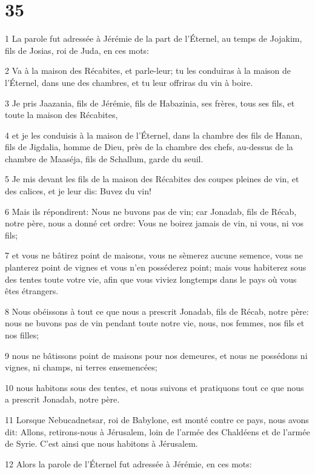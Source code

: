 \chapter{35}

\par 1 La parole fut adressée à Jérémie de la part de l'Éternel, au temps de Jojakim, fils de Josias, roi de Juda, en ces mots:
\par 2 Va à la maison des Récabites, et parle-leur; tu les conduiras à la maison de l'Éternel, dans une des chambres, et tu leur offriras du vin à boire.
\par 3 Je pris Jaazania, fils de Jérémie, fils de Habazinia, ses frères, tous ses fils, et toute la maison des Récabites,
\par 4 et je les conduisis à la maison de l'Éternel, dans la chambre des fils de Hanan, fils de Jigdalia, homme de Dieu, près de la chambre des chefs, au-dessus de la chambre de Maaséja, fils de Schallum, garde du seuil.
\par 5 Je mis devant les fils de la maison des Récabites des coupes pleines de vin, et des calices, et je leur dis: Buvez du vin!
\par 6 Mais ils répondirent: Nous ne buvons pas de vin; car Jonadab, fils de Récab, notre père, nous a donné cet ordre: Vous ne boirez jamais de vin, ni vous, ni vos fils;
\par 7 et vous ne bâtirez point de maisons, vous ne sèmerez aucune semence, vous ne planterez point de vignes et vous n'en posséderez point; mais vous habiterez sous des tentes toute votre vie, afin que vous viviez longtemps dans le pays où vous êtes étrangers.
\par 8 Nous obéissons à tout ce que nous a prescrit Jonadab, fils de Récab, notre père: nous ne buvons pas de vin pendant toute notre vie, nous, nos femmes, nos fils et nos filles;
\par 9 nous ne bâtissons point de maisons pour nos demeures, et nous ne possédons ni vignes, ni champs, ni terres ensemencées;
\par 10 nous habitons sous des tentes, et nous suivons et pratiquons tout ce que nous a prescrit Jonadab, notre père.
\par 11 Lorsque Nebucadnetsar, roi de Babylone, est monté contre ce pays, nous avons dit: Allons, retirons-nous à Jérusalem, loin de l'armée des Chaldéens et de l'armée de Syrie. C'est ainsi que nous habitons à Jérusalem.
\par 12 Alors la parole de l'Éternel fut adressée à Jérémie, en ces mots:

